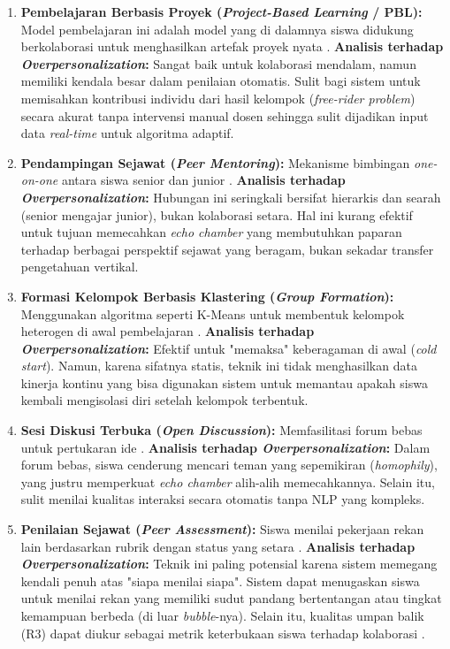 \begin{enumerate}
    \item \textbf{Pembelajaran Berbasis Proyek (\textit{Project-Based Learning} / PBL):}
    Model pembelajaran ini adalah model yang di dalamnya siswa didukung berkolaborasi untuk menghasilkan artefak proyek nyata \autocite{Zhang2023}.
    \textbf{Analisis terhadap \textit{Overpersonalization}:} Sangat baik untuk kolaborasi mendalam, namun memiliki kendala besar dalam penilaian otomatis. Sulit bagi sistem untuk memisahkan kontribusi individu dari hasil kelompok (\textit{free-rider problem}) secara akurat tanpa intervensi manual dosen \autocite{Ryoo2021} sehingga sulit dijadikan input data \textit{real-time} untuk algoritma adaptif.

    \item \textbf{Pendampingan Sejawat (\textit{Peer Mentoring}):}
    Mekanisme bimbingan \textit{one-on-one} antara siswa senior dan junior \autocite{Le2024}.
    \textbf{Analisis terhadap \textit{Overpersonalization}:} Hubungan ini seringkali bersifat hierarkis dan searah (senior mengajar junior), bukan kolaborasi setara. Hal ini kurang efektif untuk tujuan memecahkan \textit{echo chamber} yang membutuhkan paparan terhadap berbagai perspektif sejawat yang beragam, bukan sekadar transfer pengetahuan vertikal.

    \item \textbf{Formasi Kelompok Berbasis Klastering (\textit{Group Formation}):}
    Menggunakan algoritma seperti K-Means untuk membentuk kelompok heterogen di awal pembelajaran \autocite{Nalli2022}.
    \textbf{Analisis terhadap \textit{Overpersonalization}:} Efektif untuk "memaksa" keberagaman di awal (\textit{cold start}). Namun, karena sifatnya statis, teknik ini tidak menghasilkan data kinerja kontinu yang bisa digunakan sistem untuk memantau apakah siswa kembali mengisolasi diri setelah kelompok terbentuk.

    \item \textbf{Sesi Diskusi Terbuka (\textit{Open Discussion}):}
    Memfasilitasi forum bebas untuk pertukaran ide \autocite{DaifAllah2016}.
    \textbf{Analisis terhadap \textit{Overpersonalization}:} Dalam forum bebas, siswa cenderung mencari teman yang sepemikiran (\textit{homophily}), yang justru memperkuat \textit{echo chamber} alih-alih memecahkannya. Selain itu, sulit menilai kualitas interaksi secara otomatis tanpa NLP yang kompleks.

    \item \textbf{Penilaian Sejawat (\textit{Peer Assessment}):}
    Siswa menilai pekerjaan rekan lain berdasarkan rubrik dengan status yang setara \autocite{Ihichr2024}.
    \textbf{Analisis terhadap \textit{Overpersonalization}:} Teknik ini paling potensial karena sistem memegang kendali penuh atas "siapa menilai siapa". Sistem dapat menugaskan siswa untuk menilai rekan yang memiliki sudut pandang bertentangan atau tingkat kemampuan berbeda (di luar \textit{bubble}-nya). Selain itu, kualitas umpan balik (R3) dapat diukur sebagai metrik keterbukaan siswa terhadap kolaborasi \autocite{Lu2012}.
\end{enumerate}

